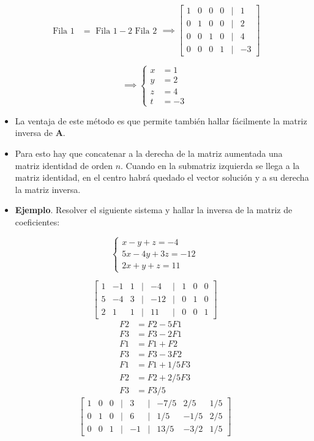 \documentclass[openany]{book}
\providecommand{\tightlist}{%
  \setlength{\itemsep}{0pt}\setlength{\parskip}{0pt}}
\begin{document}
\[
\begin{array}{cl}
\text{Fila 1} &= \text{ Fila 1} -2 \text{ Fila 2} 
\end{array}
\implies
\begin{bmatrix}
1 & 0 & 0 & 0 &|& 1\\
0 & 1 & 0 & 0 &|& 2\\
0 & 0 & 1 & 0 &|& 4\\
0 & 0 & 0 & 1 &|& -3  
\end{bmatrix}
\]

\[
\implies
\left\{
\begin{aligned}
x &= 1\\ y &= 2\\ z &= 4\\ t &= -3
\end{aligned}
\right.
\]

\begin{itemize}
\tightlist
\item
  La ventaja de este método es que permite también hallar fácilmente la matriz inversa de \(\mathbf{A}\).
\item
  Para esto hay que concatenar a la derecha de la matriz aumentada una matriz identidad de orden \(n\). Cuando en la submatriz izquierda se llega a la matriz identidad, en el centro habrá quedado el vector solución y a su derecha la matriz inversa.
\item
  \textbf{Ejemplo}. Resolver el siguiente sistema y hallar la inversa de la matriz de coeficientes:
\end{itemize}

\[
\begin{cases} 
x-y+z=-4 \\
5x-4y+3z=-12 \\
2x+y+z=11
\end{cases}
\]

\[
\begin{bmatrix}
    1 & -1 & 1 &|& -4 &|& 1 & 0 & 0\\
    5 & -4 & 3 &|& -12 &|& 0 & 1 & 0\\
    2 & 1 & 1 &|& 11 &|& 0 & 0 & 1
\end{bmatrix}
\]
\[
\begin{array}{cl}
    F2 &= F2 - 5 F1 \\
    F3 &= F3 - 2 F1 \\
    F1 &= F1 + F2 \\
    F3 &= F3 - 3 F2 \\
    F1 &= F1 + 1/5 F3 \\
    F2 &= F2 + 2/5 F3  \\
    F3 &= F3 / 5
\end{array}
\]
\[
\begin{bmatrix}
    1 & 0 & 0 &|& 3 &|& -7/5 & 2/5 & 1/5\\
    0 & 1 & 0 &|& 6 &|& 1/5 & -1/5 & 2/5\\
    0 & 0 & 1 &|& -1 &|& 13/5 & -3/2 & 1/5
\end{bmatrix}
\]
\end{document}
